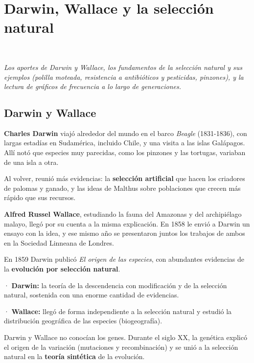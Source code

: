 \section[Darwin, Wallace y la selección natural]{Darwin, Wallace y la selección natural}
\modcomun\ \ {\color{gris}\itshape Los aportes de Darwin y Wallace, los fundamentos de la selección natural y sus ejemplos (polilla moteada, resistencia a antibióticos y pesticidas, pinzones), y la lectura de gráficos de frecuencia a lo largo de generaciones.\par}
\subsection{Darwin y Wallace}
\textbf{Charles Darwin} viajó alrededor del mundo en el barco \emph{Beagle} (1831-1836), con largas estadías en Sudamérica, incluido Chile, y una visita a las islas Galápagos. Allí notó que especies muy parecidas, como los pinzones y las tortugas, variaban de una isla a otra.

 

Al volver, reunió más evidencias: la \textbf{selección artificial} que hacen los criadores de palomas y ganado, y las ideas de Malthus sobre poblaciones que crecen más rápido que sus recursos.

 

\textbf{Alfred Russel Wallace}, estudiando la fauna del Amazonas y del archipiélago malayo, llegó por su cuenta a la misma explicación. En 1858 le envió a Darwin un ensayo con la idea, y ese mismo año se presentaron juntos los trabajos de ambos en la Sociedad Linneana de Londres.

 

En 1859 Darwin publicó \emph{El origen de las especies}, con abundantes evidencias de la \textbf{evolución por selección natural}.

  
\begin{clave} · \textbf{Darwin:} la teoría de la descendencia con modificación y de la selección natural, sostenida con una enorme cantidad de evidencias.\par · \textbf{Wallace:} llegó de forma independiente a la selección natural y estudió la distribución geográfica de las especies (biogeografía).\end{clave}
 
\begin{clave}[{Recuerda}] Darwin y Wallace no conocían los genes. Durante el siglo XX, la genética explicó el origen de la variación (mutaciones y recombinación) y se unió a la selección natural en la \textbf{teoría sintética} de la evolución.\end{clave}
